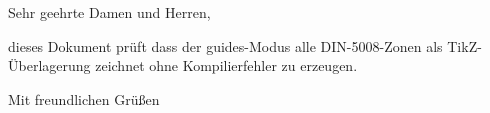 \documentclass[guides, lang=german]{../../onlinebrief24}
\begin{document}
\begin{letter}{}
\opening{Sehr geehrte Damen und Herren,}

dieses Dokument prüft dass der guides-Modus alle DIN-5008-Zonen als
TikZ-Überlagerung zeichnet ohne Kompilierfehler zu erzeugen.

\closing{Mit freundlichen Grüßen}
\end{letter}
\end{document}
